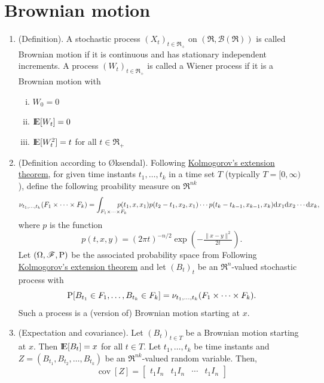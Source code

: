 \documentclass[a4paper,10pt]{scrbook}
\begin{document}
\section{Brownian motion}
\begin{enumerate}
 \item (Definition). A stochastic process \((X_t)_{t\in \Re_+}\) on \((\Re, \mathcal{B}(\Re))\) is 
 called \hypertarget{link:brownian_motion}{Brownian motion} if it is continuous and has stationary independent increments. A process 
 \((W_t)_{t\in\Re_+}\) is called a Wiener process if it is a Brownian motion with 
 \begin{enumerate}[i.]
  \item \(W_0 = 0\)
  \item \(\E[W_t] = 0\)
  \item \(\E[W_t^2] = t\) for all \(t\in\Re_+\)
 \end{enumerate}
  \item (Definition according to \O{}ksendal). 
        Following \hyperlink{link:kolmogorov_extension_thm}{Kolmogorov's extension theorem},
        for given time instants \(t_1, \ldots, t_k\) in a time set \(T\) (typically \(T=[0, \infty)\)),
        define the following proability measure on \(\Re^{nk}\)
        \[
         \nu_{t_1,\ldots, t_k}(F_1\times \cdots \times F_k)
         =
         \int_{F_1\times\cdots\times F_k}\hspace{-1.6em} p(t_1, x, x_1) p(t_2-t_1, x_2, x_1) \cdots p(t_k - t_{k-1}, x_{k-1}, x_{k})
         \mathrm{d} x_1 \mathrm{d} x_2 \cdots \mathrm{d} x_k,
        \]
	where \(p\) is the function
	\[
	 p(t, x, y) {}={} (2\pi t)^{-n/2}\exp\left(-\tfrac{\|x-y\|^2}{2t}\right).
	\]
	Let \((\Omega,\mathscr{F},\mathrm{P})\) be the associated probability space from Following \hyperlink{link:kolmogorov_extension_thm}{Kolmogorov's extension theorem} 
	and let \((B_t)_t\) be an \(\Re^{n}\)-valued stochastic process with 
	\[
	 \mathrm{P}[B_{t_1} \in F_1, \ldots, B_{t_k} \in F_k] = \nu_{t_1,\ldots, t_k}(F_1\times \cdots \times F_k).
	\]
	Such a process is a (version of) Brownian motion starting at \(x\).
 \item (Expectation and covariance). Let \((B_t)_{t\in T}\) be a Brownian motion starting at \(x\).
        Then \(\E[B_t] = x\) for all \(t\in T\). Let \(t_1, \ldots, t_k\) be time instants and 
        \(Z = (B_{t_1}, B_{t_2}, \ldots, B_{t_k})\) be an \(\Re^{nk}\)-valued random variable.
        Then,
        \[
        \operatorname{cov}[Z] = \begin{bmatrix}
                                 t_1 I_n & t_1 I_n & \cdots & t_1 I_n 

\end{bmatrix}\]
\end{enumerate}
\end{document}
